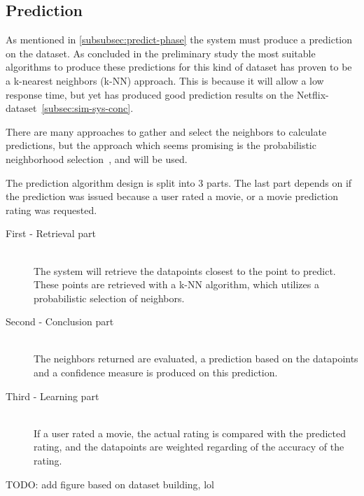 \subsection{Prediction}
As mentioned in \ref{subsubsec:predict-phase} the system must produce a prediction on the dataset. As concluded in the preliminary study the most suitable algorithms to produce these predictions for this kind of dataset has proven to be a k-nearest neighbors (k-NN) approach. This is because it will allow a low response time, but yet has produced good prediction results on the Netflix-dataset~\ref{subsec:sim-sys-conc}.

There are many approaches to gather and select the neighbors to calculate predictions, but the approach which seems promising is the probabilistic neighborhood selection~\cite{probcobfilter}, and will be used.

The prediction algorithm design is split into 3 parts. The last part depends on if the prediction was issued because a user rated a movie, or a movie prediction rating was requested.

\begin{description}
    \item[First - Retrieval part] \hfill \\
    The system will retrieve the datapoints closest to the point to predict. These points are retrieved with a k-NN algorithm, which utilizes a probabilistic selection of neighbors.

    \item[Second - Conclusion part] \hfill \\
    The neighbors returned are evaluated, a prediction based on the datapoints and a confidence measure is produced on this prediction.

    \item[Third - Learning part] \hfill \\
    If a user rated a movie, the actual rating is compared with the predicted rating, and the datapoints are weighted regarding of the accuracy of the rating.
\end{description}

TODO: add figure based on dataset building, lol
